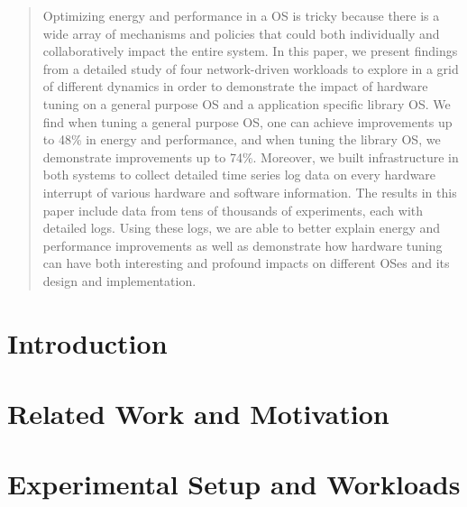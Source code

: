 \begin{abstract}
  Optimizing energy and performance in a OS is tricky because there is a wide array of mechanisms and policies that could both individually and collaboratively impact the entire system. In this paper, we present findings from a detailed study of four network-driven workloads to explore in a grid of different dynamics in order to demonstrate the impact of hardware tuning on a general purpose OS and a application specific library OS. We find when tuning a general purpose OS, one can achieve improvements up to 48\% in energy and performance, and when tuning the library OS, we demonstrate improvements up to 74\%. Moreover, we built infrastructure in both systems to collect detailed time series log data on every hardware interrupt of various hardware and software information. The results in this paper include data from tens of thousands of experiments, each with detailed logs. Using these logs, we are able to better explain energy and performance improvements as well as demonstrate how hardware tuning can have both interesting and profound impacts on different OSes and its design and implementation.
  
\end{abstract}

\section{Introduction}


\section{Related Work and Motivation}


\section{Experimental Setup and Workloads}
\label{sec:exp}




%





